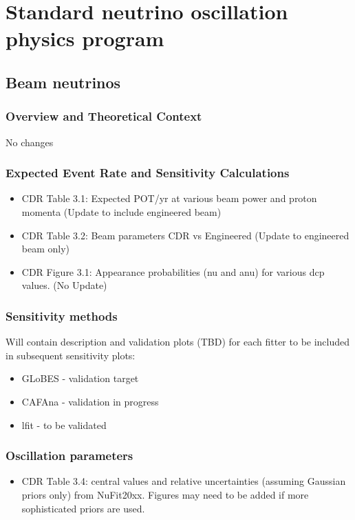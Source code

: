 \chapter{Standard neutrino oscillation physics program}
\label{ch:osc}


\section{Beam neutrinos}
\subsection{Overview and Theoretical Context}
No changes

\subsection{Expected Event Rate and Sensitivity Calculations}
\begin{itemize}
\item CDR Table 3.1: Expected POT/yr at various beam power and proton momenta (Update to include engineered beam)
\item CDR Table 3.2: Beam parameters CDR vs Engineered (Update to engineered beam only)
\item CDR Figure 3.1: Appearance probabilities (nu and anu) for various dcp values. (No Update)
\end{itemize}

\subsection{Sensitivity methods}
Will contain description and validation plots (TBD) for each fitter to be included in subsequent sensitivity plots:
\begin{itemize}
\item GLoBES - validation target
\item CAFAna - validation in progress
\item lfit - to be validated
\end{itemize}

\subsection{Oscillation parameters}
\begin{itemize}
\item CDR Table 3.4: central values and relative uncertainties (assuming Gaussian priors only) from NuFit20xx. Figures may need to be added if more sophisticated priors are used.

\end{itemize}

